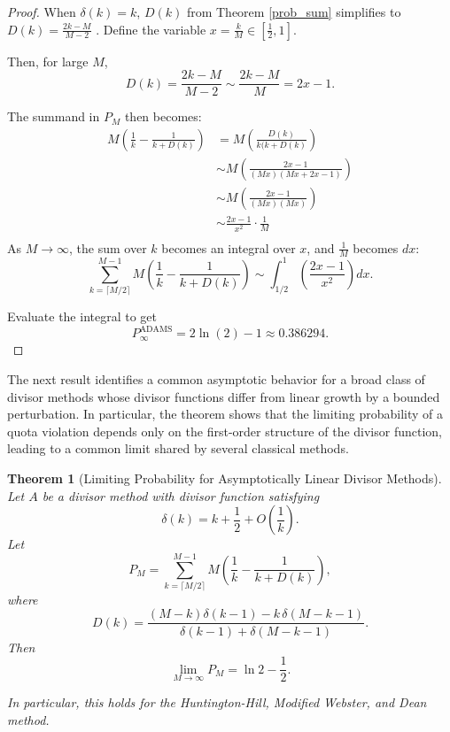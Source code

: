 \documentclass[11pt]{article}
\newtheorem{theorem}{Theorem}[section]
\theoremstyle{definition}
\theoremstyle{definition}
\begin{document}
\begin{proof}
When $\delta(k)=k$, $D(k)$ from Theorem \ref{prob_sum} simplifies to $D(k) = \frac{2k-M}{M-2}$ . Define the variable $x = \frac{k}{M} \in \left[\tfrac{1}{2},1\right].$

Then, for large $M$, 
$$D(k) = \frac{2k-M}{M-2} \sim \frac{2k-M}{M} = 2x - 1.$$

The summand in $P_M$ then becomes:
\begin{align*}
M \left( \frac{1}{k} - \frac{1}{k + D(k)} \right) & = M \left( \frac{D(k)}{k(k+D(k)} \right) \\ &\sim M\left( \frac{2x-1}{(Mx)(Mx+2x-1)}\right)\\
 & \sim M\left( \frac{2x-1}{(Mx)(Mx)}\right)\\
 & \sim \frac{2x-1}{x^2}\cdot\frac1M\\
\end{align*}
As $M \to \infty$, the sum over $k$ becomes an integral over $x$, and $\frac 1M$ becomes $dx$:
$$
\sum_{k=\lceil M/2 \rceil}^{M-1} M \left(\frac{1}{k} - \frac{1}{k + D(k)}\right) \sim \int_{1/2}^{1} \left( \frac{2x-1}{x^2} \right) dx.
$$

Evaluate the integral to get 
$$P_\infty^\text{ADAMS} = 2\ln(2)-1\approx 0.386294.$$
\end{proof}

The next result identifies a common asymptotic behavior for a broad class of divisor methods whose divisor functions differ from linear growth by a bounded perturbation. In particular, the theorem shows that the limiting probability of a quota violation depends only on the first-order structure of the divisor function, leading to a common limit shared by several classical methods.

\begin{theorem}[Limiting Probability for Asymptotically Linear Divisor Methods]\label{thm:limit_kplusahalf}
Let $A$ be a divisor method with divisor function satisfying
$$
\delta(k)=k+\frac{1}{2}+O\!\left(\frac{1}{k}\right).
$$
Let
$$
P_M=\sum_{k=\lceil M/2\rceil}^{M-1} M\left(\frac{1}{k}-\frac{1}{k+D(k)}\right),
$$
where
$$D(k)=\frac{(M-k)\delta(k-1)-k\,\delta(M-k-1)}{\delta(k-1)+\delta(M-k-1)}.$$
Then
$$\lim_{M\to\infty} P_M = \ln 2 - \frac{1}{2}.$$

In particular, this holds for the Huntington-Hill, Modified Webster, and Dean method. 
\end{theorem}
\end{document}
